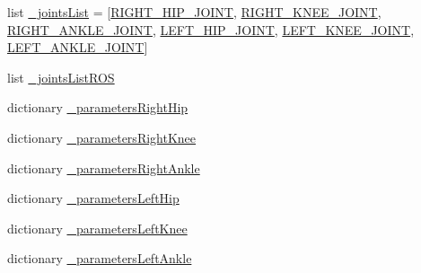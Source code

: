 \begin{DoxyCompactItemize}
list \mbox{\hyperlink{namespacepedal__simulation__interpolation__cubic__derivative_a46585eccb2f61bf4492924b1491a63c3}{\+\_\+joints\+List}} = \mbox{[}\mbox{\hyperlink{namespacepedal__simulation__interpolation__cubic__derivative_ab7526d770fd7644fb4ae9877e2e5a0a4}{R\+I\+G\+H\+T\+\_\+\+H\+I\+P\+\_\+\+J\+O\+I\+NT}}, \mbox{\hyperlink{namespacepedal__simulation__interpolation__cubic__derivative_aa114b9878d6a2c2217f63815a71b8947}{R\+I\+G\+H\+T\+\_\+\+K\+N\+E\+E\+\_\+\+J\+O\+I\+NT}}, \mbox{\hyperlink{namespacepedal__simulation__interpolation__cubic__derivative_aa168535cfe5c5c0f1d238d2558fa1431}{R\+I\+G\+H\+T\+\_\+\+A\+N\+K\+L\+E\+\_\+\+J\+O\+I\+NT}}, \mbox{\hyperlink{namespacepedal__simulation__interpolation__cubic__derivative_ab0985b6c554bba4c51460ccc2e72409a}{L\+E\+F\+T\+\_\+\+H\+I\+P\+\_\+\+J\+O\+I\+NT}}, \mbox{\hyperlink{namespacepedal__simulation__interpolation__cubic__derivative_ab75a384144342f49e9b0a6607162902f}{L\+E\+F\+T\+\_\+\+K\+N\+E\+E\+\_\+\+J\+O\+I\+NT}}, \mbox{\hyperlink{namespacepedal__simulation__interpolation__cubic__derivative_afb5c7e31d8be3b45d589b829782a7aa1}{L\+E\+F\+T\+\_\+\+A\+N\+K\+L\+E\+\_\+\+J\+O\+I\+NT}}\mbox{]}
\item 
list \mbox{\hyperlink{namespacepedal__simulation__interpolation__cubic__derivative_a8ca3a1d78a7f1dff1d8a0b63c510463e}{\+\_\+joints\+List\+R\+OS}}
\item 
dictionary \mbox{\hyperlink{namespacepedal__simulation__interpolation__cubic__derivative_acf30248ba78ced8eef7a7c47610d08f1}{\+\_\+parameters\+Right\+Hip}}
\item 
dictionary \mbox{\hyperlink{namespacepedal__simulation__interpolation__cubic__derivative_a639f362959fe622515eb7683d1b5aeb6}{\+\_\+parameters\+Right\+Knee}}
\item 
dictionary \mbox{\hyperlink{namespacepedal__simulation__interpolation__cubic__derivative_aa0679a4877ce46951c4c8653d79678bd}{\+\_\+parameters\+Right\+Ankle}}
\item 
dictionary \mbox{\hyperlink{namespacepedal__simulation__interpolation__cubic__derivative_ad516fcf5abb6ce486ab5c433b2c16ade}{\+\_\+parameters\+Left\+Hip}}
\item 
dictionary \mbox{\hyperlink{namespacepedal__simulation__interpolation__cubic__derivative_a56278512442581d350526ec9e3d614e2}{\+\_\+parameters\+Left\+Knee}}
\item 
dictionary \mbox{\hyperlink{namespacepedal__simulation__interpolation__cubic__derivative_a1f065e4e4892997d87b96f78a988e28c}{\+\_\+parameters\+Left\+Ankle}}
\item 

\end{DoxyCompactItemize}
